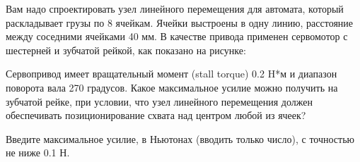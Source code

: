 
Вам надо спроектировать узел линейного перемещения для автомата, который раскладывает грузы по 8 ячейкам.  Ячейки выстроены в одну линию,  расстояние между соседними ячейками 40 мм.  В качестве привода применен сервомотор с шестерней и зубчатой рейкой, как показано на рисунке:


Сервопривод имеет вращательный момент (stall torque) 0.2 H*м  и диапазон поворота вала 270 градусов.  Какое максимальное усилие можно получить на зубчатой рейке, при условии, что узел линейного перемещения должен обеспечивать позиционирование схвата над центром любой из ячеек?   

Введите максимальное усилие, в Ньютонах (вводить только число),  с точностью не ниже 0.1 Н.